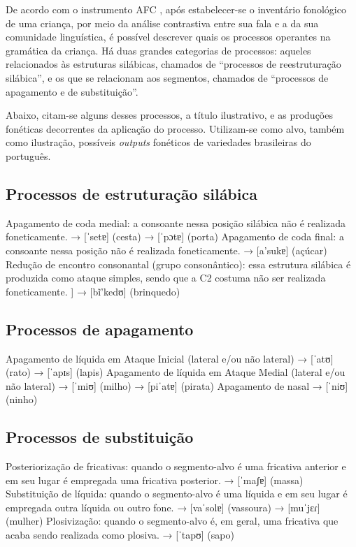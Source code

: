 \documentclass[output=paper,colorlinks,citecolor=brown,booklanguage=portuguese]{langscibook}
\begin{document}
De acordo com o instrumento AFC \citep{Yavas1991}, após estabelecer-se o inventário fonológico de uma criança, por meio da análise contrastiva entre sua fala e a da sua comunidade linguística, é possível descrever quais os processos operantes na gramática da criança. Há duas grandes categorias de processos: aqueles relacionados às estruturas silábicas, chamados de “processos de reestruturação silábica”, e os que se relacionam aos segmentos, chamados de “processos de apagamento e de substituição”. 

Abaixo, citam-se alguns desses processos, a título ilustrativo, e as produções fonéticas decorrentes da aplicação do processo. Utilizam-se como alvo, também como ilustração, possíveis \emph{outputs} fonéticos de variedades brasileiras do português.

\subsection{Processos de estruturação silábica}


Apagamento de coda medial: a consoante nessa posição silábica não é realizada foneticamente. 
\ea {[ˈsestɐ]} → [ˈsetɐ] (cesta)
\z
\ea {[ˈpɔɾtɐ]} → [ˈpɔtɐ] (porta)
\z
Apagamento de coda final: a consoante nessa posição não é realizada foneticamente.
\ea {[a'sukɐɾ]} → [a'sukɐ] (açúcar)
\z
Redução de encontro consonantal (grupo consonântico): essa estrutura silábica é produzida como ataque simples, sendo que a C2 costuma não ser realizada foneticamente.
\ea {[bɾĩ'kedʊ}] → [bĩ'kedʊ] (brinquedo)
\z

\subsection{Processos de apagamento}

Apagamento de líquida em Ataque Inicial (lateral e/ou não lateral)
\ea {[ˈxatʊ]} → [ˈatʊ] (rato)
\z
\ea {[ˈlapɪs]} → [ˈapɪs] (lapis)
\z
Apagamento de líquida em Ataque Medial (lateral e/ou não lateral)
\ea {[ˈmiʎʊ]} → [ˈmiʊ] (milho)
\z
\ea {[pi‘ɾatɐ]} → [piˈatɐ] (pirata)
\z
Apagamento de nasal
\ea {[ˈniɲʊ]} → [ˈniʊ] (ninho)
\z



\subsection{Processos de substituição}

Posteriorização de fricativas: quando o segmento-alvo é uma fricativa anterior e em seu lugar é empregada uma fricativa posterior.
\ea {[ˈmasɐ]} → [ˈmaʃɐ] (massa)
\z
Substituição de líquida: quando o segmento-alvo é uma líquida e em seu lugar é empregada outra líquida ou outro fone.
\ea  {[vaˈsoɾɐ]} → [vaˈsolɐ] (vassoura)
\z
\ea {[muˈʎɛɾ]} → [muˈjɛɾ] (mulher)
\z
Plosivização: quando o segmento-alvo é, em geral, uma fricativa que acaba sendo realizada como plosiva.
\ea {[ˈsapʊ]} → [ˈtapʊ] (sapo)
\z
\end{document}
